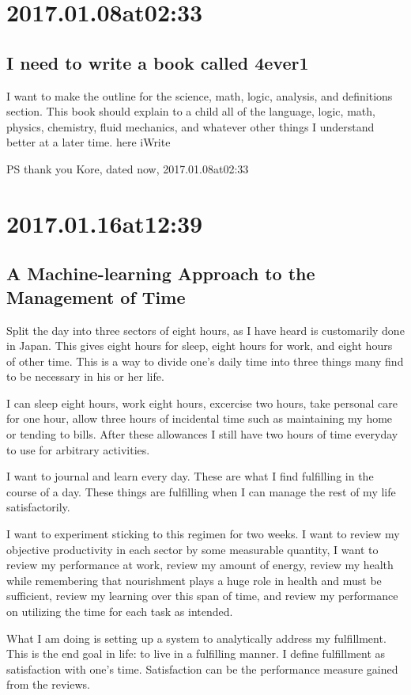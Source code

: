 \begin{enumerate}
\begin{enumerate}
\section*{ 2017.01.08at02:33 }
\subsection*{ I need to write a book called 4ever1 }
I want to make the outline for the science, math, logic, analysis, and definitions section.
This book should explain to a child all of the language, logic, math, physics, chemistry, fluid mechanics, and whatever other things I understand better at a later time.
here iWrite

PS thank you Kore, dated now, 2017.01.08at02:33

\section*{ 2017.01.16at12:39 }
\subsection*{ A Machine-learning Approach to the Management of Time }
Split the day into three sectors of eight hours, as I have heard is customarily done in Japan.
This gives eight hours for sleep, eight hours for work, and eight hours of other time.
This is a way to divide one's daily time into three things many find to be necessary in his or her life.

I can sleep eight hours, work eight hours, excercise two hours, take personal care for one hour, allow three hours of incidental time such as maintaining my home or tending to bills.
After these allowances I still have two hours of time everyday to use for arbitrary activities.

I want to journal and learn every day.
These are what I find fulfilling in the course of a day.
These things are fulfilling when I can manage the rest of my life satisfactorily.

I want to experiment sticking to this regimen for two weeks.
I want to review my objective productivity in each sector by some measurable quantity, I want to review my performance at work, review my amount of energy, review my health while remembering that nourishment plays a huge role in health and must be sufficient, review my learning over this span of time, and review my performance on utilizing the time for each task as intended.

What I am doing is setting up a system to analytically address my fulfillment.
This is the end goal in life: to live in a fulfilling manner.
I define fulfillment as satisfaction with one's time.
Satisfaction can be the performance measure gained from the reviews.


\end{enumerate}
\end{enumerate}
